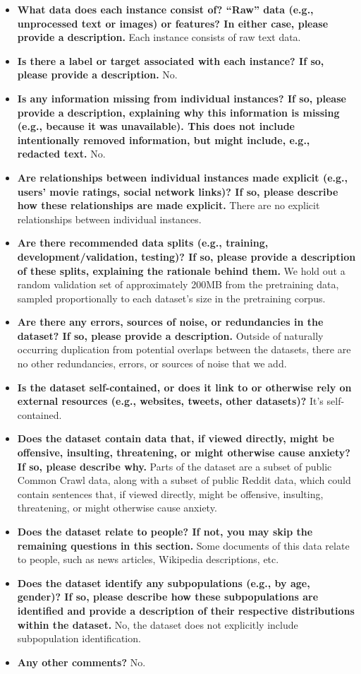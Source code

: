 \begin{itemize}
    \item \textbf{What data does each instance consist of? “Raw” data (e.g., unprocessed text or images) or features? In either case, please provide a description.} Each instance consists of raw text data.
    \item \textbf{Is there a label or target associated with each instance? If so, please provide a description.} No.
    \item \textbf{Is any information missing from individual instances? If so, please provide a description, explaining why this information is missing (e.g., because it was unavailable). This does not include intentionally removed information, but might include, e.g., redacted text.} No.
    \item \textbf{Are relationships between individual instances made explicit (e.g., users' movie ratings, social network links)? If so, please describe how these relationships are made explicit.} There are no explicit relationships between individual instances.
    \item \textbf{Are there recommended data splits (e.g., training, development/validation, testing)? If so, please provide a description of these splits, explaining the rationale behind them.} We hold out a random validation set of approximately 200MB from the pretraining data, sampled proportionally to each dataset's size in the pretraining corpus.
    \item \textbf{Are there any errors, sources of noise, or redundancies in the dataset? If so, please provide a description.}  Outside of naturally occurring duplication from potential overlaps between the datasets, there are no other redundancies, errors, or sources of noise that we add.
    \item \textbf{Is the dataset self-contained, or does it link to or otherwise rely on external resources (e.g., websites, tweets, other datasets)?} It's self-contained.
    \item \textbf{Does the dataset contain data that, if viewed directly, might be offensive, insulting, threatening, or might otherwise cause anxiety? If so, please describe why.} Parts of the dataset are a subset of public Common Crawl data, along with a subset of public Reddit data, which could contain sentences that, if viewed directly, might be offensive, insulting, threatening, or might otherwise cause anxiety.
    \item \textbf{Does the dataset relate to people? If not, you may skip the remaining questions in this section.}  Some documents of this data relate to people, such as news articles, Wikipedia descriptions, etc.
    \item \textbf{Does the dataset identify any subpopulations (e.g., by age, gender)? If so, please describe how these subpopulations are identified and provide a description of their respective distributions within the dataset.} No, the dataset does not explicitly include subpopulation identification.
    \item \textbf{Any other comments?} No.
\end{itemize}

